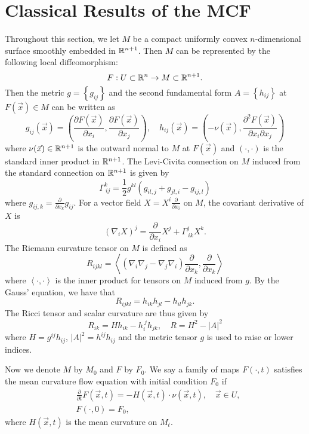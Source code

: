 %

\chapter{Classical Results of the MCF}


Throughout this section, we let $M$ be a compact uniformly convex $n$-dimensional surface smoothly embedded in $\mathbb{R}^{n+1}$. Then $M$ can be represented by the following local diffeomorphism:
\[
	F: U \subset \mathbb{R}^n \rightarrow M \subset \mathbb{R}^{n+1}.
\]
Then the metric $g= \left\{ g_{ij} \right\}  $ and the second fundamental form $A= \left\{ h_{ij} \right\}  $ at $F(\vec{x}) \in M$ can be written as
\[
	g_{ij}(\vec{x})=\left( \frac{\partial F(\vec{x})}{\partial x_i}, \frac{\partial F(\vec{x})}{\partial x_j} \right) ,\quad h_{ij}(\vec{x})=\left( -\nu (\vec{x}), \frac{\partial^2 F(\vec{x})}{\partial x_i \partial x_j} \right)
\]
where $\nu (\vec{x}) \in \mathbb{R}^{n+1}$ is the outward normal to $M$ at $F(\vec{x})$ and $\left( \cdot , \cdot \right) $ is the standard inner product in $\mathbb{R}^{n+1}$. The Levi-Civita connection on $M$ induced from the standard connection on $\mathbb{R}^{n+1}$ is given by 
\[\Gamma_{\ ij}^{k} =\frac{1}{2}g_{ }^{kl} \left( g_{ il,j}^{} +g_{ jl,i}^{} - g_{ij ,l}^{}  \right) \]
where $g_{ij ,k}=\frac{\partial }{\partial x_{k}} g_{ij}$. For a vector field $X=X^i \frac{\partial }{\partial x_{i}} $ on $M$, the covariant derivative of $X$ is \[\left( \nabla_{i}^{} X \right) ^j=\frac{\partial }{\partial x_{i}} X^j + \Gamma_{\ ik}^{j} X^k.\]
The Riemann curvature tensor on $M$ is defined as 
\[R_{ijkl}= \left< (\nabla_{i}^{} \nabla_{j}^{} -\nabla_{j}^{} \nabla_{i}^{}) \frac{\partial }{\partial x_{k}} , \frac{\partial }{\partial x_{k}}  \right> \] where $\left\langle  \cdot , \cdot \right\rangle $ is the inner product for tensors on $M$ induced from $g$. By the Gauss' equation, we have that \[R_{ijkl}=h_{ik}h_{jl }^{}-h_{ il}^{} h_{ jk}^{} . \] The Ricci tensor and scalar curvature are thus given by
\[R_{ik}=Hh_{ik}-h_{ i}^{\ j} h_{ jk}^{} , \quad R=H^2-\left| A \right| ^2\]
where $H=g^{ij}h_{ij}$, $\left| A \right| ^2=h^{ij}h_{ij}$ and the metric tensor $g$ is used to raise or lower indices.

Now we denote $M$ by $M_0$ and $F$ by $F_0$. We say a family of maps $F(\cdot , t)$ satisfies the mean curvature flow equation with initial condition $F_0$ if
\begin{align*}
	 & \frac{\partial }{\partial t} F(\vec{x},t)=-H(\vec{x},t) \cdot \nu (\vec{x},t), \quad \vec{x} \in U, \\
	 & F(\cdot ,0)=F_0,
\end{align*}
where $H(\vec{x},t)$ is the mean curvature on $M_t$.


